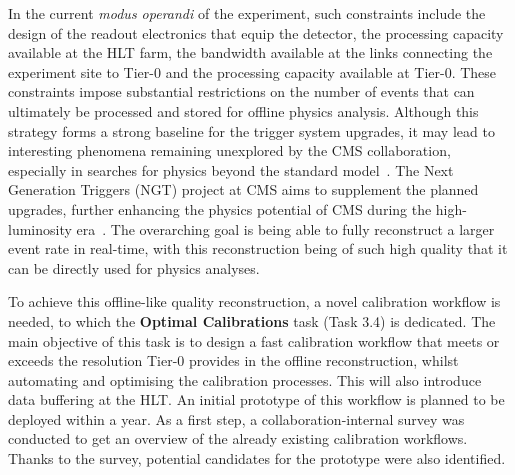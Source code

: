In the current \textit{modus operandi} of the experiment, such constraints include the design of the readout electronics that equip the detector, the processing capacity available at the HLT farm, the bandwidth available at the links connecting the experiment site to Tier-0 and the processing capacity available at Tier-0. These constraints impose substantial restrictions on the number of events that can ultimately be processed and stored for offline physics analysis. Although this strategy forms a strong baseline for the trigger system upgrades, it may lead to interesting phenomena remaining unexplored by the CMS collaboration, especially in searches for physics beyond the standard model~\cite{cms_exotica_summary_plots}.
The Next Generation Triggers (NGT) project at CMS aims to supplement the planned upgrades, further enhancing the physics potential of CMS during the high-luminosity era~\cite{NGT_proposal}. The overarching goal is being able to fully reconstruct a larger event rate in real-time, with this reconstruction being of such high quality that it can be directly used for physics analyses.

To achieve this offline-like quality reconstruction, a novel calibration workflow is needed, to which the \textbf{Optimal Calibrations} task (Task 3.4) is dedicated. The main objective of this task is to design a fast calibration workflow that meets or exceeds the resolution Tier-0 provides in the offline reconstruction, whilst automating and optimising the calibration processes. This will also introduce data buffering at the HLT. An initial prototype of this workflow is planned to be deployed within a year. As a first step, a collaboration-internal survey was conducted to get an overview of the already existing calibration workflows. Thanks to the survey, potential candidates for the prototype were also identified.

